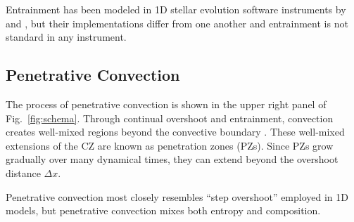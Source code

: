 Entrainment has been modeled in 1D stellar evolution software instruments by \citet{staritsin_2013} and \citet{scott_etal_2021}, but their implementations differ from one another and entrainment is not standard in any instrument.


\subsection{Penetrative Convection}
The process of penetrative convection is shown in the upper right panel of Fig.~\ref{fig:schema}.
Through continual overshoot and entrainment, convection creates well-mixed regions beyond the convective boundary \citep{anders_etal_2022}.
These well-mixed extensions of the CZ are known as penetration zones (PZs).
Since PZs grow gradually over many dynamical times, they can extend beyond the overshoot distance $\Delta x$.

Penetrative convection most closely resembles ``step overshoot'' employed in 1D models, but penetrative convection mixes both entropy and composition.
